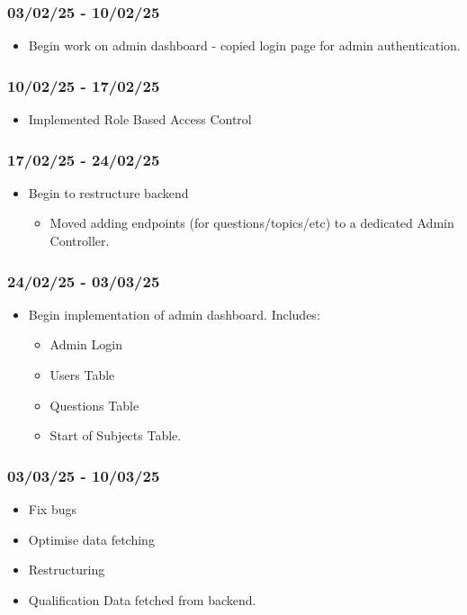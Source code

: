 \documentclass[]{final_report}
\begin{document}
\subsubsection*{03/02/25 - 10/02/25}
\begin{itemize}
    \item Begin work on admin dashboard - copied login page for admin authentication.
\end{itemize}

\subsubsection*{10/02/25 - 17/02/25}
\begin{itemize}
    \item Implemented Role Based Access Control
\end{itemize}

\subsubsection*{17/02/25 - 24/02/25}
\begin{itemize}
    \item Begin to restructure backend
    \begin{itemize}
        \item Moved adding endpoints (for questions/topics/etc) to a dedicated Admin Controller.
    \end{itemize}
\end{itemize}

\subsubsection*{24/02/25 - 03/03/25}
\begin{itemize}
    \item Begin implementation of admin dashboard. Includes:
    \begin{itemize}
        \item Admin Login
        \item Users Table
        \item Questions Table
        \item Start of Subjects Table.
    \end{itemize}
\end{itemize}

\subsubsection*{03/03/25 - 10/03/25}
\begin{itemize}
    \item Fix bugs
    \item Optimise data fetching
    \item Restructuring
    \item Qualification Data fetched from backend.
\end{itemize}
\end{document}
